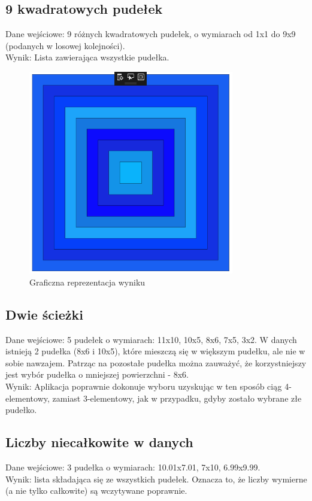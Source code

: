 \documentclass{article}
\begin{document}
\subsection{9 kwadratowych pudełek}
Dane wejściowe: 9 różnych kwadratowych pudełek, o wymiarach od 1x1 do 9x9 (podanych w losowej kolejności).  \\
Wynik: Lista zawierająca wszystkie pudełka.
\begin{figure}[H]
\centering
\includegraphics[width=0.8\textwidth]{square_boxes_res.png}
\caption{Graficzna reprezentacja wyniku}
\end{figure}

\subsection{Dwie ścieżki}
Dane wejściowe: 5 pudełek o wymiarach: 11x10, 10x5, 8x6, 7x5, 3x2. W danych istnieją 2 pudełka (8x6 i 10x5), które mieszczą się w większym pudełku, ale nie w sobie nawzajem. Patrząc na pozostałe pudełka można zauważyć, że korzystniejszy jest wybór pudełka o mniejszej powierzchni - 8x6.\\
Wynik: Aplikacja poprawnie dokonuje wyboru uzyskując w ten sposób ciąg 4-elementowy, zamiast 3-elementowy, jak w przypadku, gdyby zostało wybrane złe pudełko.

\subsection{Liczby niecałkowite w danych}
Dane wejściowe: 3 pudełka o wymiarach: 10.01x7.01, 7x10, 6.99x9.99.\\
Wynik: lista składająca się ze wszystkich pudełek. Oznacza to, że liczby wymierne (a nie tylko całkowite) są wczytywane poprawnie.
\end{document}
